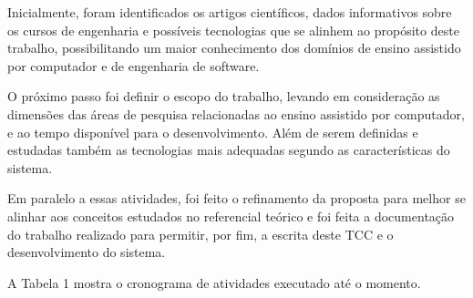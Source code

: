 Inicialmente, foram identificados os artigos científicos, dados informativos sobre os cursos de engenharia e possíveis tecnologias que se alinhem ao propósito deste trabalho, possibilitando um maior conhecimento dos domínios de ensino assistido por computador e de engenharia de software.

O próximo passo foi definir o escopo do trabalho, levando em consideração as dimensões das áreas de pesquisa relacionadas ao ensino assistido por computador, e ao tempo disponível para o desenvolvimento. Além de serem definidas e estudadas também as tecnologias mais adequadas segundo as características do sistema.

Em paralelo a essas atividades, foi feito o refinamento da proposta para melhor se alinhar aos conceitos estudados no referencial teórico e foi feita a documentação do trabalho realizado para permitir, por fim, a escrita deste TCC e o desenvolvimento do sistema. 

A Tabela 1 mostra o cronograma de atividades executado até o momento.

